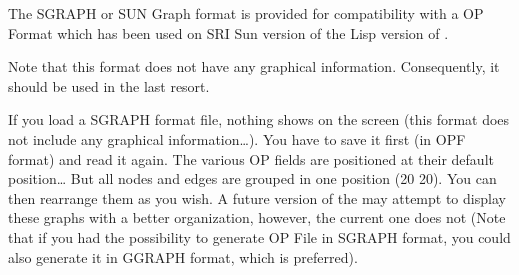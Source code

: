 The SGRAPH or SUN Graph format is provided for compatibility with a OP
Format which has been used on SRI Sun version of the Lisp version of \OPRS.

Note that this format does not have any graphical information.
Consequently, it should be used in the last resort.

If you load a SGRAPH format file, nothing shows on the screen (this format does
not include any graphical information\dots{}). You have to save it first (in
OPF format) and read it again. The various OP fields are positioned at their
default position\dots{} But all nodes and edges are grouped in one position (20
20). You can then rearrange them as you wish. A future version of the \OPE{}
may attempt to display these graphs with a better organization, however, the
current one does not (Note that if you had the possibility to generate OP File
in SGRAPH format, you could also generate it in GGRAPH format, which is
preferred).


